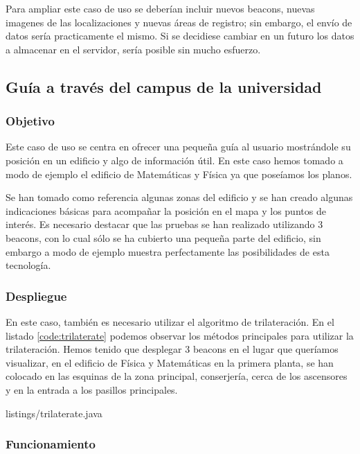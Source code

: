 Para ampliar este caso de uso se deberían incluir nuevos beacons, nuevas imagenes de las localizaciones y nuevas áreas de registro; sin embargo, el envío de datos sería practicamente el mismo. Si se decidiese cambiar en un futuro los datos a almacenar en el servidor, sería posible sin mucho esfuerzo.

\subsection{Guía a través del campus de la universidad}

\subsubsection{Objetivo}

Este caso de uso se centra en ofrecer una pequeña guía al usuario mostrándole su posición en un edificio y algo de información útil. En este caso hemos tomado a modo de ejemplo el edificio de Matemáticas y Física ya que poseíamos los planos. 

Se han tomado como referencia algunas zonas del edificio y se han creado algunas indicaciones básicas para acompañar la posición en el mapa y los puntos de interés. Es necesario destacar que las pruebas se han realizado utilizando 3 beacons, con lo cual sólo se ha cubierto una pequeña parte del edificio, sin embargo a modo de ejemplo muestra perfectamente las posibilidades de esta tecnología.

\subsubsection{Despliegue}

En este caso, también es necesario utilizar el algoritmo de trilateración. En el listado \ref{code:trilaterate} podemos observar los métodos principales para utilizar la trilateración. Hemos tenido que desplegar 3 beacons en el lugar que queríamos visualizar, en el edificio de Física y Matemáticas en la primera planta, se han colocado en las esquinas de la zona principal, conserjería, cerca de los ascensores y en la entrada a los pasillos principales.



{listings/trilaterate.java} %


\subsubsection{Funcionamiento}



